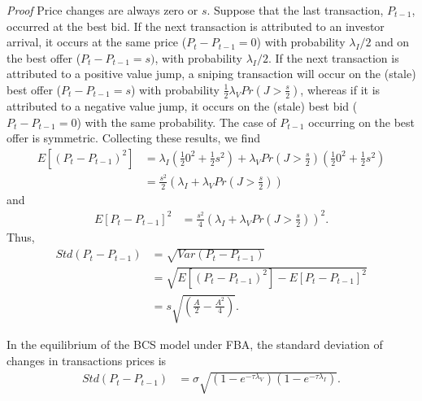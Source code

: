\documentclass[12pt]{article}
\begin{document}
\begin{appendices}
\noindent \emph{Proof} Price changes are always zero or $s$.  Suppose that the last transaction, $P_{t-1}$, occurred at the best bid. If the next transaction is attributed to an investor arrival, it occurs at the same price ($P_t-P_{t-1} = 0$) with probability $\lambda_I/2$ and on the best offer ($P_t-P_{t-1} = s)$, with probability $\lambda_I/2$. If the next transaction is attributed to a positive value jump, a sniping transaction will occur on the (stale) best offer ($P_t-P_{t-1}=s$) with probability $\frac{1}{2}\lambda_{V}Pr\left(J>\frac{s}{2}\right)$, whereas if it is attributed to a negative value jump, it occurs on the (stale) best bid ($P_t-P_{t-1}=0$) with the same probability. The case of $P_{t-1}$ occurring on the best offer is symmetric. Collecting these results, we find
\begin{align}
E\left[(P_{t}-P_{t-1})^{2}\right] & =\lambda_{I}\left(\frac{1}{2}0^{2}+\frac{1}{2}s^{2}\right)+\lambda_{V}Pr\left(J>\frac{s}{2}\right)\left(\frac{1}{2}0^{2}+\frac{1}{2}s^{2}\right) \nonumber \\
& =\frac{s^{2}}{2}\left(\lambda_{I}+\lambda_{V}Pr\left(J>\frac{s}{2}\right)\right) \label{pDiff}
\end{align}
and
\begin{align}
E\left[P_{t}-P_{t-1}\right]^{2} & =\frac{s^{2}}{4}\left(\lambda_{I}+\lambda_{V}Pr\left(J>\frac{s}{2}\right)\right)^{2}.
\end{align}
Thus,
\begin{align}
Std(P_t-P_{t-1}) & = \sqrt{Var\left(P_{t}-P_{t-1}\right)} \nonumber \\
& = \sqrt{E\left[(P_{t}-P_{t-1})^{2}\right]-E\left[P_{t}-P_{t-1}\right]^{2}} \nonumber \\
& = s \sqrt{\left(\frac{A}{2}-\frac{A^{2}}{4}\right)}. \label{varPDiff}
\end{align}

\begin{proposition} \label{stdDeltaPFBA}
In the equilibrium of the BCS model under FBA, the standard deviation of changes in transactions prices is
\begin{align}
Std\left(P_{t}-P_{t-1}\right) & = \sigma \sqrt{\left(1-e^{-\tau \lambda_V}\right) \left(1-e^{-\tau \lambda_I}\right)}. \label{dPFBA} 
\end{align}
\end{proposition}


\end{appendices}
\end{document}
